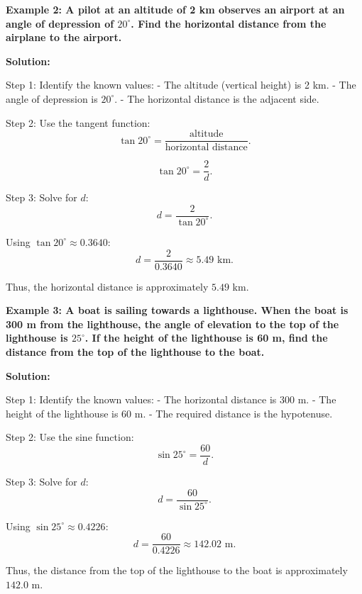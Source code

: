\begin{flushleft}
	\textbf{Example 2: A pilot at an altitude of 2 km observes an airport at an angle of depression of $20^\circ$. Find the horizontal distance from the airplane to the airport.}
	
	\vspace{0.5cm}
	\textbf{Solution:}
	\vspace{0.5cm}
	
	Step 1: Identify the known values:
	- The altitude (vertical height) is 2 km.
	- The angle of depression is $20^\circ$.
	- The horizontal distance is the adjacent side.
	
	Step 2: Use the tangent function:
	\[
	\tan 20^\circ = \frac{\text{altitude}}{\text{horizontal distance}}.
	\]
	
	\[
	\tan 20^\circ = \frac{2}{d}.
	\]
	
	Step 3: Solve for $d$:
	\[
	d = \frac{2}{\tan 20^\circ}.
	\]
	
	Using $\tan 20^\circ \approx 0.3640$:
	\[
	d = \frac{2}{0.3640} \approx 5.49 \text{ km}.
	\]
	
	Thus, the horizontal distance is approximately $5.49$ km.
\end{flushleft}

\begin{flushleft}
	\textbf{Example 3: A boat is sailing towards a lighthouse. When the boat is 300 m from the lighthouse, the angle of elevation to the top of the lighthouse is $25^\circ$. If the height of the lighthouse is 60 m, find the distance from the top of the lighthouse to the boat.}
	
	\vspace{0.5cm}
	\textbf{Solution:}
	\vspace{0.5cm}
	
	Step 1: Identify the known values:
	- The horizontal distance is 300 m.
	- The height of the lighthouse is 60 m.
	- The required distance is the hypotenuse.
	
	Step 2: Use the sine function:
	\[
	\sin 25^\circ = \frac{60}{d}.
	\]
	
	Step 3: Solve for $d$:
	\[
	d = \frac{60}{\sin 25^\circ}.
	\]
	
	Using $\sin 25^\circ \approx 0.4226$:
	\[
	d = \frac{60}{0.4226} \approx 142.02 \text{ m}.
	\]
	
	Thus, the distance from the top of the lighthouse to the boat is approximately $142.0$ m.
\end{flushleft}


